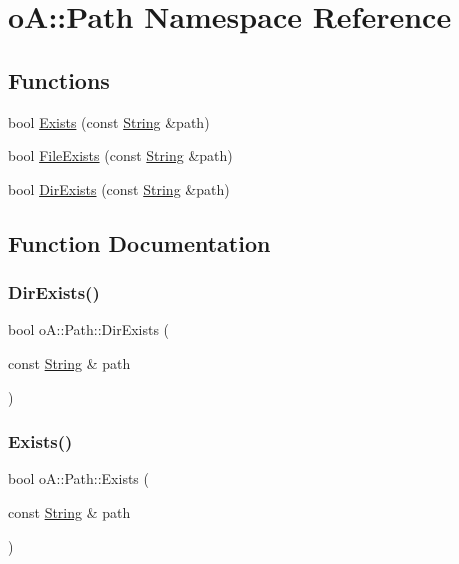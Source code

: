 \hypertarget{namespaceo_a_1_1_path}{}\section{oA\+:\+:Path Namespace Reference}
\label{namespaceo_a_1_1_path}
\subsection*{Functions}
\begin{DoxyCompactItemize}
\item 
bool \mbox{\hyperlink{namespaceo_a_1_1_path_a761a94ba9a50cc164837c4dc4b4c78ae}{Exists}} (const \mbox{\hyperlink{classo_a_1_1_string}{String}} \&path)
\item 
bool \mbox{\hyperlink{namespaceo_a_1_1_path_af332d947cbb51cf1141c0718169748c3}{File\+Exists}} (const \mbox{\hyperlink{classo_a_1_1_string}{String}} \&path)
\item 
bool \mbox{\hyperlink{namespaceo_a_1_1_path_ae8828b311b87426010a6b60192ebf78e}{Dir\+Exists}} (const \mbox{\hyperlink{classo_a_1_1_string}{String}} \&path)
\end{DoxyCompactItemize}


\subsection{Function Documentation}
\mbox{\label{namespaceo_a_1_1_path_ae8828b311b87426010a6b60192ebf78e}} 
\subsubsection{\texorpdfstring{Dir\+Exists()}{DirExists()}}
{\footnotesize\ttfamily bool o\+A\+::\+Path\+::\+Dir\+Exists (\begin{DoxyParamCaption}\item[{const \mbox{\hyperlink{classo_a_1_1_string}{String}} \&}]{path }\end{DoxyParamCaption})}

\mbox{\label{namespaceo_a_1_1_path_a761a94ba9a50cc164837c4dc4b4c78ae}} 
\subsubsection{\texorpdfstring{Exists()}{Exists()}}
{\footnotesize\ttfamily bool o\+A\+::\+Path\+::\+Exists (\begin{DoxyParamCaption}\item[{const \mbox{\hyperlink{classo_a_1_1_string}{String}} \&}]{path }\end{DoxyParamCaption})}

